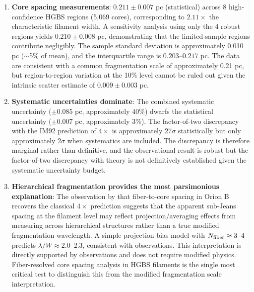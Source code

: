 \documentclass[11pt,a4paper]{article}
\begin{document}
\begin{enumerate}
    \item \textbf{Core spacing measurements}: $0.211 \pm 0.007$ pc (statistical) across 8 high-confidence HGBS regions (5,069 cores), corresponding to $2.11\times$ the characteristic filament width. A sensitivity analysis using only the 4 robust regions yields $0.210 \pm 0.008$ pc, demonstrating that the limited-sample regions contribute negligibly. The sample standard deviation is approximately 0.010 pc ($\sim$5\% of mean), and the interquartile range is $0.203$--$0.217$ pc. The data are consistent with a common fragmentation scale of approximately 0.21 pc, but region-to-region variation at the 10\% level cannot be ruled out given the intrinsic scatter estimate of $0.009 \pm 0.003$ pc.

    \item \textbf{Systematic uncertainties dominate}: The combined systematic uncertainty ($\pm0.085$ pc, approximately 40\%) dwarfs the statistical uncertainty ($\pm0.007$ pc, approximately 3\%). The factor-of-two discrepancy with the IM92 prediction of $4\times$ is approximately 27$\sigma$ statistically but only approximately 2$\sigma$ when systematics are included. The discrepancy is therefore marginal rather than definitive, and the observational result is robust but the factor-of-two discrepancy with theory is not definitively established given the systematic uncertainty budget.

    \item \textbf{Hierarchical fragmentation provides the most parsimonious explanation}: The observation by \citet{Yang2024} that fiber-to-core spacing in Orion B recovers the classical $4\times$ prediction suggests that the apparent sub-Jeans spacing at the filament level may reflect projection/averaging effects from measuring across hierarchical structures rather than a true modified fragmentation wavelength. A simple projection bias model with $N_{\rm fiber} \approx 3$--$4$ predicts $\lambda/W \approx 2.0$--$2.3$, consistent with observations. This interpretation is directly supported by observations and does not require modified physics. Fiber-resolved core spacing analysis in HGBS filaments is the single most critical test to distinguish this from the modified fragmentation scale interpretation.


\end{enumerate}
\end{document}
